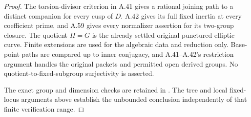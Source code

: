 \begin{proof}
The torsion-divisor criterion in A.41 gives a rational
joining path to a distinct companion for every cusp of
\(D\). A.42 gives its full fixed inertia at every
coefficient prime, and A.59 gives every normalizer assertion
for its two-group closure. The quotient \(H=G\) is the
already settled original punctured elliptic curve.
Finite extensions are used for the algebraic data and
reduction only. Base-point paths are compared up to inner
conjugacy, and A.41--A.42's restriction argument handles
the original packets and permitted open derived groups.
No quotient-to-fixed-subgroup surjectivity is asserted.

The exact group and dimension checks are retained in
. The tree and local
fixed-locus arguments above establish the unbounded
conclusion independently of that finite verification range.
\end{proof}
